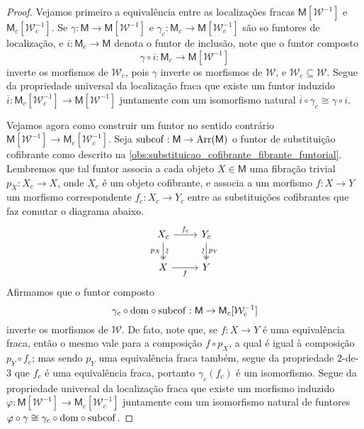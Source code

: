 \begin{proof}
  Vejamos primeiro a equivalência entre as localizações fracas $\mathsf{M}[\mathcal{W}^{-1}]$ e $\mathsf{M}_{c}[\mathcal{W}_{c}^{-1}]$.
  Se $\gamma: \mathsf{M} \to \mathsf{M}[\mathcal{W}^{-1}]$ e $\gamma_{c}: \mathsf{M}_{c} \to \mathsf{M}[\mathcal{W}_{c}^{-1}]$ são so funtores de localização, e $i: \mathsf{M}_{c} \to \mathsf{M}$ denota o funtor de inclusão, note que o funtor composto
  \begin{displaymath}
    \gamma \circ i: \mathsf{M}_{c} \to \mathsf{M}[\mathcal{W}^{-1}]
  \end{displaymath}
  inverte os morfismos de $\mathcal{W}_{c}$, pois $\gamma$ inverte os morfismos de $\mathcal{W}$, e $\mathcal{W}_{c} \subseteq \mathcal{W}$.
  Segue da propriedade universal da localização fraca que existe um funtor induzido $\overline{i}: \mathsf{M}_{c}[\mathcal{W}_{c}^{-1}] \to \mathsf{M}[\mathcal{W}^{-1}]$ juntamente com um isomorfismo natural $\overline{i} \circ \gamma_{c} \cong \gamma \circ i$.

  Vejamos agora como construir um funtor no sentido contrário $\mathsf{M}[\mathcal{W}^{-1}] \to \mathsf{M}_{c}[\mathcal{W}_{c}^{-1}]$.
  Seja $\mathrm{subcof}: \mathsf{M} \to \mathrm{Arr}(\mathsf{M})$ o funtor de substituição cofibrante como descrito na \cref{obs:substituicao_cofibrante_fibrante_funtorial}.
  Lembremos que tal funtor associa a cada objeto $X \in \mathsf{M}$ uma fibração trivial $p_{X}: X_{c} \to X$, onde $X_{c}$ é um objeto cofibrante, e associa a um morfismo $f: X \to Y$ um morfismo correspondente $f_{c}: X_{c} \to Y_{c}$ entre as substituições cofibrantes que faz comutar o diagrama abaixo.
  \begin{displaymath}
    \begin{tikzcd}
      X_{c}
      \arrow[r, "f_{c}"]
      \arrow[d, two heads, "p_{X}" {swap}, "\sim" {sloped}]
      & Y_{c}
      \arrow[d, two heads, "p_{Y}", "\sim" {swap,sloped}]
      \\ X
      \arrow[r, "f" swap]
      & Y
    \end{tikzcd}
  \end{displaymath}
  Afirmamos que o funtor composto
  \begin{displaymath}
    \gamma_{c} \circ \mathrm{dom} \circ \mathrm{subcof}: \mathsf{M} \to \mathsf{M}_{c}[\mathcal{W}_{c}^{-1}]
  \end{displaymath}
  inverte os morfismos de $\mathcal{W}$.
  De fato, note que, se $f: X \to Y$ é uma equivalência fraca, então o mesmo vale para a composição $f \circ p_{X}$, a qual é igual à composição $p_{Y} \circ f_{c}$; mas sendo $p_{Y}$ uma equivalência fraca também, segue da propriedade 2-de-3 que $f_{c}$ é uma equivalência fraca, portanto $\gamma_{c}(f_{c})$ é um isomorfismo.
  Segue da propriedade universal da localização fraca que existe um morfismo induzido $\varphi: \mathsf{M}[\mathcal{W}^{-1}] \to \mathsf{M}_{c}[\mathcal{W}_{c}^{-1}]$ juntamente com um isomorfismo natural de funtores $\varphi \circ \gamma \cong \gamma_{c} \circ \mathrm{dom} \circ \mathrm{subcof}$.


\end{proof}
